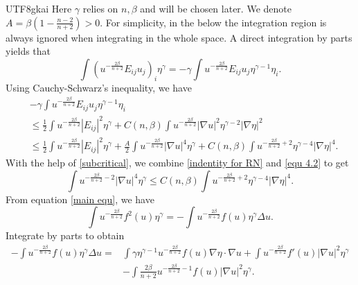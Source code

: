 \documentclass[reqno,12pt]{amsart}
\numberwithin{equation}{section}
\begin{document}
\begin{CJK}{UTF8}{gkai}
  Here $\gamma$ relies on $n,\beta$ and will be chosen later. We denote $A=\beta\left(1-\frac{n-2}{n+2}\right)>0$. For simplicity, in the below the integration region is always ignored when integrating in the whole space. A
  direct integration by parts yields that
  \begin{equation*}
  	\int\left(u^{-\frac{2\beta}{n+2}}E_{ij}u_{j}\right)_{i}\eta^{\gamma}
  =-\gamma \int u^{-\frac{2\beta}{n+2}}E_{ij}u_{j}\eta^{\gamma-1}\eta_{i}.
  \end{equation*}
  Using  Cauchy-Schwarz's inequality, we have
  \begin{equation}\label{equ 4.2}
  	\begin{aligned}
  		&-\gamma \int u^{-\frac{2\beta}{n+2}}E_{ij}u_{j}\eta^{\gamma-1}\eta_{i}\\
  		&\le
  		 \frac{1}{2}\int u^{-\frac{2\beta}{n+2}}|E_{ij}|^{2}\eta^{\gamma}
  		+C(n,\beta)\int u^{-\frac{2\beta}{n+2}} |\nabla u|^{2}\eta^{\gamma-2}|\nabla \eta|^{2}\\
  		&\le  \frac{1}{2}\int u^{-\frac{2\beta}{n+2}}|E_{ij}|^{2}\eta^{\gamma}
  		+\frac{A}{2}\int u^{-\frac{2\beta}{n+2}}|\nabla u|^{4}\eta^{\gamma}
  		+C(n,\beta)\int u^{-\frac{2\beta}{n+2}+2}\eta^{\gamma-4}|\nabla \eta|^{4}.
  	\end{aligned}
  \end{equation}
  With the help of \eqref{subcritical}, we combine \eqref{indentity for RN} and \eqref{equ 4.2} to get
  \begin{equation}\label{first integral inequ}
  	\int u^{-\frac{2\beta}{n+2}-2}|\nabla u|^{4}\eta^{\gamma}\le C(n,\beta)\int u^{-\frac{2\beta}{n+2}+2}\eta^{\gamma-4}|\nabla \eta|^{4}.
  \end{equation}
  From equation \eqref{main equ}, we have
  \begin{equation}\label{identity from mainequ}
            \int u^{-\frac{2\beta}{n+2}} f^{2}(u)\eta^{\gamma}=-\int u^{-\frac{2\beta}{n+2}} f(u)\eta^{\gamma}\Delta u.
  \end{equation}
  Integrate by parts to obtain
  \begin{equation}\label{integration by parts1}
  	\begin{aligned}
  		 -\int u^{-\frac{2\beta}{n+2}} f(u)\eta^{\gamma}\Delta u
  		 =&\int \gamma\eta^{\gamma-1}u^{-\frac{2\beta}{n+2}}f(u)\nabla\eta\cdot \nabla u+\int u^{-\frac{2\beta}{n+2}} f'(u)|\nabla u|^{2}\eta^{\gamma}\\
  		 &-\int \frac{2\beta}{n+2}u^{-\frac{2\beta}{n+2}-1} f(u)|\nabla u|^{2}\eta^{\gamma}.
  	\end{aligned}

\end{equation}
\end{CJK}
\end{document}
